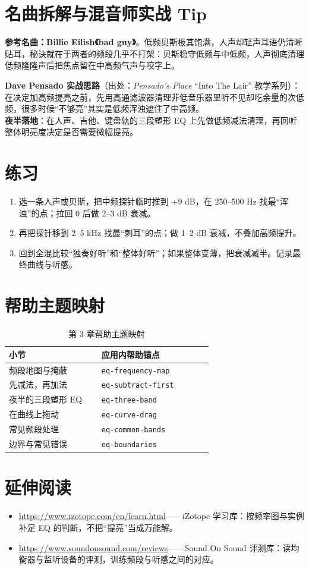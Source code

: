 \section{名曲拆解与混音师实战 Tip}

\textbf{参考名曲：Billie Eilish《bad guy》}。低频贝斯极其饱满，人声却轻声耳语仍清晰贴耳，秘诀就在于两者的频段几乎不打架：贝斯稳守低频与中低频，人声彻底清理低频隆隆声后把焦点留在中高频气声与咬字上。

\begin{tipbox}
\textbf{Dave Pensado 实战思路}（出处：\emph{Pensado's Place} ``Into The Lair'' 教学系列）：在决定加高频提亮之前，先用高通滤波器清理非低音乐器里听不见却吃余量的次低频，很多时候“不够亮”其实是低频浑浊遮住了中高频。\\
\textbf{夜半落地}：在人声、吉他、键盘轨的三段塑形 EQ 上先做低频减法清理，再回听整体明亮度决定是否需要微幅提亮。
\end{tipbox}

\section{练习}


\begin{exercise}
\begin{enumerate}
  \item 选一条人声或贝斯，把中频探针临时推到 $+9$ dB，在 250--500 Hz 找最“浑浊”的点；拉回 0 后做 2--3 dB 衰减。
  \item 再把探针移到 2--5 kHz 找最“刺耳”的点；做 1--2 dB 衰减，不叠加高频提升。
  \item 回到全混比较“独奏好听”和“整体好听”；如果整体变薄，把衰减减半。记录最终曲线与听感。
\end{enumerate}
\end{exercise}

\section{帮助主题映射}

\begin{table}[htbp]
\centering
\small
\begin{tabular}{@{}p{0.40\linewidth}p{0.48\linewidth}@{}}
\hline
小节 & 应用内帮助锚点 \\
\hline
频段地图与掩蔽 & \texttt{eq-frequency-map} \\
先减法，再加法 & \texttt{eq-subtract-first} \\
夜半的三段塑形 EQ & \texttt{eq-three-band} \\
在曲线上拖动 & \texttt{eq-curve-drag} \\
常见频段处理 & \texttt{eq-common-bands} \\
边界与常见错误 & \texttt{eq-boundaries} \\
\hline
\end{tabular}
\caption{第 3 章帮助主题映射}
\end{table}

\section*{延伸阅读}
\begin{itemize}[leftmargin=1.5em]
\item \url{https://www.izotope.com/en/learn.html}——iZotope 学习库：按频率图与实例补足 EQ 的判断，不把“提亮”当成万能解。
\item \url{https://www.soundonsound.com/reviews}——Sound On Sound 评测库：读均衡器与监听设备的评测，训练频段与听感之间的对应。
\end{itemize}
